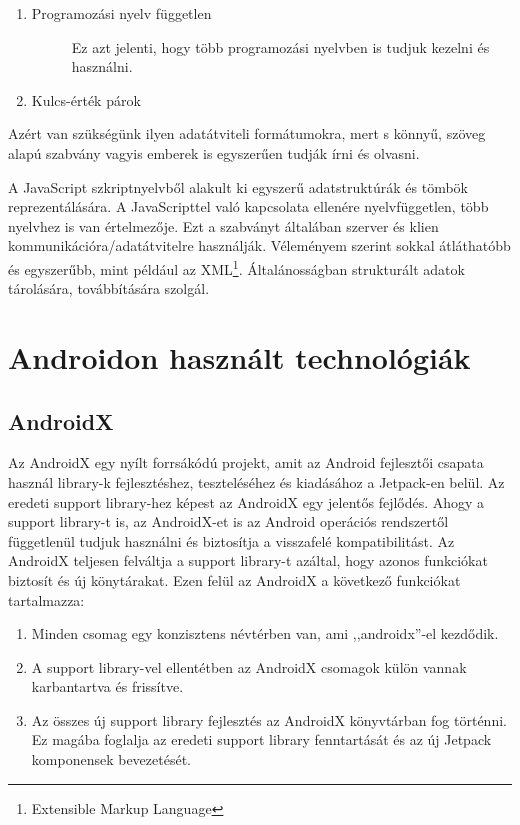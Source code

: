 \documentclass{thesis-ekf}
\theoremstyle{definition}
\theoremstyle{remark}
\begin{document}
\begin{enumerate}
	\item 
	\begin{description}
		\item[Programozási nyelv független] Ez azt jelenti, hogy több programozási nyelvben is tudjuk kezelni és használni.
	\end{description}
	\item 
	\begin{description}
		\item[Kulcs-érték párok] 
	\end{description}

\end{enumerate}

Azért van szükségünk ilyen adatátviteli formátumokra, mert s
könnyű, szöveg alapú szabvány vagyis emberek is egyszerűen tudják írni és olvasni.

A JavaScript szkriptnyelvből alakult ki egyszerű adatstruktúrák és tömbök reprezentálására. 
A JavaScripttel való kapcsolata ellenére nyelvfüggetlen, több nyelvhez is van értelmezője. 
Ezt a szabványt általában szerver és klien kommunikációra/adatátvitelre használják.
Véleményem szerint sokkal átláthatóbb és egyszerűbb, mint például az XML\footnote{Extensible Markup Language}.
Általánosságban strukturált adatok tárolására, továbbítására szolgál. \cite{json}


\section{Androidon használt technológiák}

\subsection{AndroidX}

Az AndroidX egy nyílt forrsákódú projekt, amit az Android fejlesztői csapata használ library-k fejlesztéshez, teszteléséhez és kiadásához a Jetpack-en belül.
Az eredeti support library-hez képest az AndroidX egy jelentős fejlődés. Ahogy a support library-t is, az AndroidX-et is az Android operációs rendszertől függetlenül tudjuk használni és biztosítja a visszafelé kompatibilitást.
Az AndroidX teljesen felváltja a support library-t azáltal, hogy azonos funkciókat biztosít és új könytárakat.
Ezen felül az AndroidX a következő funkciókat tartalmazza:

\begin{enumerate}
	\item Minden csomag egy konzisztens névtérben van, ami ,,androidx''-el kezdődik.
	\item A support library-vel ellentétben az AndroidX csomagok külön vannak karbantartva és frissítve.
	\item Az összes új support library fejlesztés az AndroidX könyvtárban fog történni. Ez magába foglalja az eredeti support library fenntartását és az új Jetpack komponensek bevezetését.
\end{enumerate}
\end{document}
